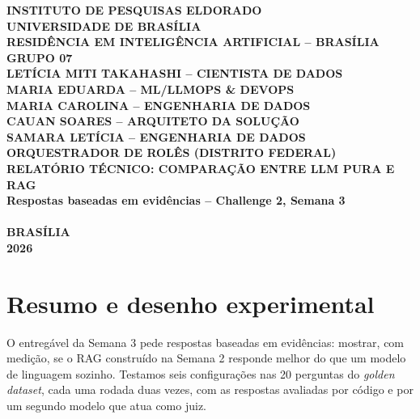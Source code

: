 \documentclass[11pt,a4paper]{article}
\begin{document}
\begin{titlepage}
\begin{center}
{\bfseries INSTITUTO DE PESQUISAS ELDORADO\\
UNIVERSIDADE DE BRASÍLIA\\
RESIDÊNCIA EM INTELIGÊNCIA ARTIFICIAL -- BRASÍLIA\\[2.8cm]

GRUPO 07\\[0.35cm]
LETÍCIA MITI TAKAHASHI -- CIENTISTA DE DADOS\\
MARIA EDUARDA -- ML/LLMOPS \& DEVOPS\\
MARIA CAROLINA -- ENGENHARIA DE DADOS\\
CAUAN SOARES -- ARQUITETO DA SOLUÇÃO\\
SAMARA LETÍCIA -- ENGENHARIA DE DADOS\\[3.0cm]

ORQUESTRADOR DE ROLÊS (DISTRITO FEDERAL)\\[0.3cm]
{\normalsize RELATÓRIO TÉCNICO: COMPARAÇÃO ENTRE LLM PURA E RAG\\
Respostas baseadas em evidências -- Challenge 2, Semana 3}\\[1.2cm]

\\[2.8cm]

BRASÍLIA\\
2026}
\end{center}
\end{titlepage}

\setcounter{page}{1}

\section{Resumo e desenho experimental}

O entregável da Semana 3 pede respostas baseadas em evidências: mostrar, com medição, se o RAG construído na Semana 2 responde melhor do que um modelo de linguagem sozinho. Testamos seis configurações nas 20 perguntas do \textit{golden dataset}, cada uma rodada duas vezes, com as respostas avaliadas por código e por um segundo modelo que atua como juiz.
\end{document}
